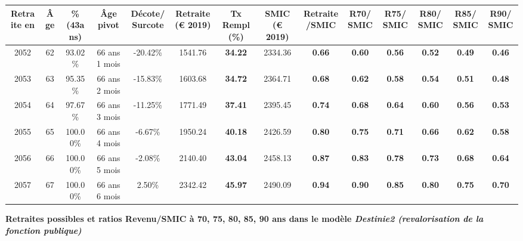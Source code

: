 \begin{adjustbox}{max width=\textwidth} 
\begin{tabular}[htb]{|c|c||c|c|c||c|c||c|c||c|c|c|c|c|} 
\hline 
 Retraite en &  Âge &  \%(43ans) &  Âge pivot &  Décote/Surcote &  Retraite (\euro{} 2019) &  Tx Rempl(\%) &  SMIC (\euro{} 2019) &  Retraite/SMIC &  R70/SMIC &  R75/SMIC &  R80/SMIC &  R85/SMIC &  R90/SMIC \\ 
\hline \hline 
 2052 &  62 &  93.02\% &  66 ans 1 mois &  -20.42\% &  1541.76 &  {\bf 34.22} &  2334.36 &  {\bf {\color{red} 0.66}} &  {\bf {\color{red} 0.60}} &  {\bf {\color{red} 0.56}} &  {\bf {\color{red} 0.52}} &  {\bf {\color{red} 0.49}} &  {\bf {\color{red} 0.46}} \\ 
\hline 
 2053 &  63 &  95.35\% &  66 ans 2 mois &  -15.83\% &  1603.68 &  {\bf 34.72} &  2364.71 &  {\bf {\color{red} 0.68}} &  {\bf {\color{red} 0.62}} &  {\bf {\color{red} 0.58}} &  {\bf {\color{red} 0.54}} &  {\bf {\color{red} 0.51}} &  {\bf {\color{red} 0.48}} \\ 
\hline 
 2054 &  64 &  97.67\% &  66 ans 3 mois &  -11.25\% &  1771.49 &  {\bf 37.41} &  2395.45 &  {\bf {\color{red} 0.74}} &  {\bf {\color{red} 0.68}} &  {\bf {\color{red} 0.64}} &  {\bf {\color{red} 0.60}} &  {\bf {\color{red} 0.56}} &  {\bf {\color{red} 0.53}} \\ 
\hline 
 2055 &  65 &  100.00\% &  66 ans 4 mois &  -6.67\% &  1950.24 &  {\bf 40.18} &  2426.59 &  {\bf {\color{red} 0.80}} &  {\bf {\color{red} 0.75}} &  {\bf {\color{red} 0.71}} &  {\bf {\color{red} 0.66}} &  {\bf {\color{red} 0.62}} &  {\bf {\color{red} 0.58}} \\ 
\hline 
 2056 &  66 &  100.00\% &  66 ans 5 mois &  -2.08\% &  2140.40 &  {\bf 43.04} &  2458.13 &  {\bf {\color{red} 0.87}} &  {\bf {\color{red} 0.83}} &  {\bf {\color{red} 0.78}} &  {\bf {\color{red} 0.73}} &  {\bf {\color{red} 0.68}} &  {\bf {\color{red} 0.64}} \\ 
\hline 
 2057 &  67 &  100.00\% &  66 ans 6 mois &  2.50\% &  2342.42 &  {\bf 45.97} &  2490.09 &  {\bf {\color{red} 0.94}} &  {\bf {\color{red} 0.90}} &  {\bf {\color{red} 0.85}} &  {\bf {\color{red} 0.80}} &  {\bf {\color{red} 0.75}} &  {\bf {\color{red} 0.70}} \\ 
\hline 
\hline 
\end{tabular} 
\end{adjustbox} 
 
 \vspace{0.1cm} 
{\bf \noindent Retraites possibles et ratios Revenu/SMIC à 70, 75, 80, 85, 90 ans dans le modèle \emph{Destinie2 (revalorisation de la fonction publique)}}  
 
